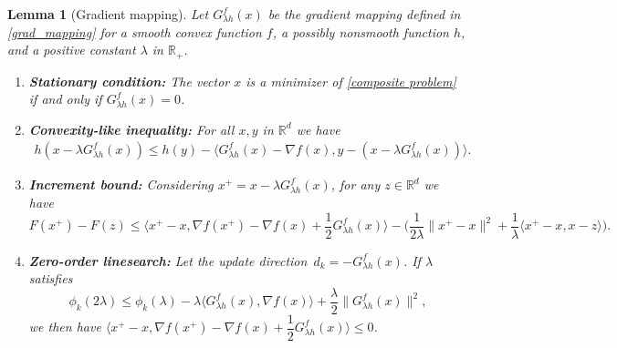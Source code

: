\documentclass[10pt,a4paper]{amsart}
\newtheorem{lemma}{Lemma}
\begin{document}
\begin{lemma}[Gradient mapping]\label{keylemma}
Let $G^{f}_{\lambda h}(x)$ be the gradient mapping defined in \eqref{grad_mapping} for a smooth convex function $f$, a possibly nonsmooth function $h$, and a positive constant $\lambda$ in $\mathbb{R}_+$.
\begin{enumerate}[label=(\roman*), itemsep = 0mm, topsep = 0mm, leftmargin = 7mm]
\item \label{lema3}
{\bf Stationary condition:} The vector $x$ is a minimizer of \eqref{composite problem} if and only if $G^{f}_{\lambda h}(x) = 0$.

\item \label{lema1}
{\bf Convexity-like inequality:} For all $x,y$ in $\mathbb{R}^d$ we have
\begin{align*}
    h\left(x-\lambda G^{f}_{\lambda h}(x)\right) \leq h(y) - \langle G^{f}_{\lambda h}(x) - \nabla f(x), y - (x - \lambda G^{f}_{\lambda h}(x)) \rangle.  %
\end{align*}

\item \label{lema2}
{\bf Increment bound:} Considering $x^+ = x - \lambda G^{f}_{\lambda h}(x)$, for any $z \in \mathbb{R}^d$ we have
\begin{equation*}\label{eq3}
F(x^+) - F(z) \leq \langle x^+ - x,  \nabla f(x^+) - \nabla f(x) + \dfrac{1}{2}G^{f}_{\lambda h}(x) \rangle - \Big( \dfrac{1}{2\lambda} \|x^+ - x\|^2 + \dfrac{1}{\lambda}\langle x^+ -x, x - z \rangle \Big).
\end{equation*}

\item \label{lema4linesearch}
{\bf Zero-order linesearch:} Let the update direction~$d_k = -G^{f}_{\lambda h}(x)$. If $\lambda$ satisfies
\begin{equation}\label{ZO linesearch}
    \phi_k(2\lambda) \leq \phi_k(\lambda) - \lambda \langle G^{f}_{\lambda h}(x), \nabla f(x) \rangle + \dfrac{\lambda}{2}\|G^{f}_{\lambda h}(x)\|^2,
\end{equation}
we then have $\langle x^+ - x,  \nabla f(x^+) - \nabla f(x) + \dfrac{1}{2}G^{f}_{\lambda h}(x) \rangle \leq 0$.
\end{enumerate}
\end{lemma}
\end{document}
